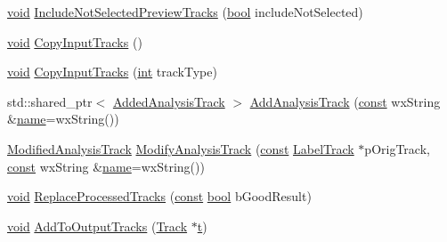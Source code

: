 \begin{DoxyCompactItemize}
\item 
\hyperlink{sound_8c_ae35f5844602719cf66324f4de2a658b3}{void} \hyperlink{class_effect_a8232e6fbd0614985ab1935da85015515}{Include\+Not\+Selected\+Preview\+Tracks} (\hyperlink{mac_2config_2i386_2lib-src_2libsoxr_2soxr-config_8h_abb452686968e48b67397da5f97445f5b}{bool} include\+Not\+Selected)
\item 
\hyperlink{sound_8c_ae35f5844602719cf66324f4de2a658b3}{void} \hyperlink{class_effect_a039810b41ba1f3e233360caeb48f769d}{Copy\+Input\+Tracks} ()
\item 
\hyperlink{sound_8c_ae35f5844602719cf66324f4de2a658b3}{void} \hyperlink{class_effect_aef775f7a217bada5f920363d5ebe744e}{Copy\+Input\+Tracks} (\hyperlink{xmltok_8h_a5a0d4a5641ce434f1d23533f2b2e6653}{int} track\+Type)
\item 
std\+::shared\+\_\+ptr$<$ \hyperlink{class_effect_1_1_added_analysis_track}{Added\+Analysis\+Track} $>$ \hyperlink{class_effect_aed4be09718b7eaffa4ba2e0bf63a0a1f}{Add\+Analysis\+Track} (\hyperlink{getopt1_8c_a2c212835823e3c54a8ab6d95c652660e}{const} wx\+String \&\hyperlink{lib_2expat_8h_a1b49b495b59f9e73205b69ad1a2965b0}{name}=wx\+String())
\item 
\hyperlink{class_effect_1_1_modified_analysis_track}{Modified\+Analysis\+Track} \hyperlink{class_effect_adbf33586d01372d6519120165d53290c}{Modify\+Analysis\+Track} (\hyperlink{getopt1_8c_a2c212835823e3c54a8ab6d95c652660e}{const} \hyperlink{class_label_track}{Label\+Track} $\ast$p\+Orig\+Track, \hyperlink{getopt1_8c_a2c212835823e3c54a8ab6d95c652660e}{const} wx\+String \&\hyperlink{lib_2expat_8h_a1b49b495b59f9e73205b69ad1a2965b0}{name}=wx\+String())
\item 
\hyperlink{sound_8c_ae35f5844602719cf66324f4de2a658b3}{void} \hyperlink{class_effect_af97713f3d7ca2c647d19e1ec4501d12e}{Replace\+Processed\+Tracks} (\hyperlink{getopt1_8c_a2c212835823e3c54a8ab6d95c652660e}{const} \hyperlink{mac_2config_2i386_2lib-src_2libsoxr_2soxr-config_8h_abb452686968e48b67397da5f97445f5b}{bool} b\+Good\+Result)
\item 
\hyperlink{sound_8c_ae35f5844602719cf66324f4de2a658b3}{void} \hyperlink{class_effect_aecbd97d208f9350845a4f931a1db470d}{Add\+To\+Output\+Tracks} (\hyperlink{class_track}{Track} $\ast$\hyperlink{octave__test_8m_aaccc9105df5383111407fd5b41255e23}{t})
\end{DoxyCompactItemize}
